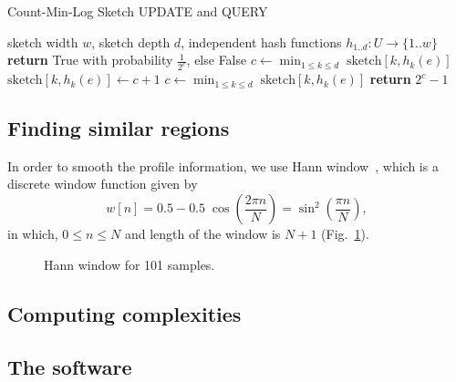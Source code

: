 \begin{minipage}{.5\linewidth}
\begin{algorithm}[H]
  \caption{Count-Min-Log Sketch UPDATE and QUERY}\label{euclid}
  \begin{algorithmic}[1]
    \Require sketch width $w$, sketch depth $d$, independent hash functions $h_{1..d}: U\to \{1..w\}$
    \State \textbf{return} True with probability $\frac{1}{2^c}$, else False
    \EndFunction
    \State
    \State $c\gets \min_{1\le k\le d}\;\mathrm{sketch}[k, h_k(e)]$
    \State $\mathrm{sketch}[k, h_k(e)]\gets c+1$
    \EndIf
    \EndFor
    \EndIf
    \EndFunction
    \State
    \State $c\gets \min_{1\le k\le d}\;\mathrm{sketch}[k, h_k(e)]$
    \State \textbf{return} $2^c-1$
    \EndFunction
  \end{algorithmic}
\end{algorithm}
\end{minipage}

\subsection{Finding similar regions}

In order to smooth the profile information, we use Hann window~\cite{blackman1959particular}, which is a discrete window function given by
\begin{equation}
  \label{eq.hann}
  w[n]=0.5-0.5\;\cos \left({\frac {2\pi n}{N}}\right)=\sin ^{2}\left({\frac {\pi n}{N}}\right),
\end{equation}
in which, $0\le n\le N$ and length of the window is $N+1$ (Fig.~\ref{fig.hann}).

\begin{figure}[!h]
\centering
\caption{Hann window for 101 samples.}
\label{fig.hann}
\end{figure}

\subsection{Computing complexities}

\subsection{The software}
\label{subsec.software}

